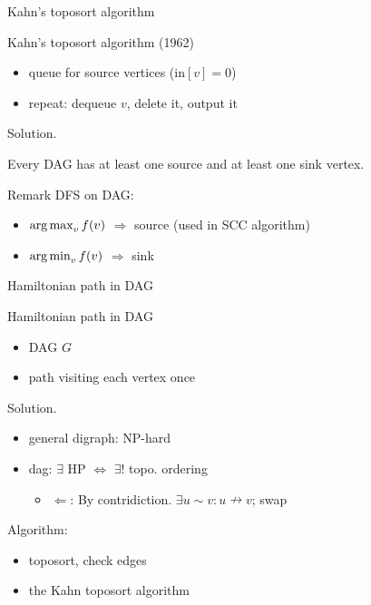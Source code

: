 \begin{frame}{Kahn's toposort algorithm}
  \begin{exampleblock}{Kahn's toposort algorithm (1962) }
    \begin{itemize}
      \item queue for source vertices ($\text{in}[v] = 0$)
      \item repeat: dequeue $v$, delete it, output it
    \end{itemize}
  \end{exampleblock}

  \begin{block}{Solution.}
    \begin{lemma}
      Every DAG has at least one source and at least one sink vertex.
    \end{lemma}
  \end{block}

  \begin{alertblock}{Remark}
    DFS on DAG:
    \begin{itemize}
      \item $\operatorname*{arg\,max}_{v} f(v)$ $\Rightarrow$ source (used in SCC algorithm)
      \item $\operatorname*{arg\,min}_{v} f(v)$ $\Rightarrow$ sink
    \end{itemize}
  \end{alertblock}
\end{frame}
\begin{frame}{Hamiltonian path in DAG}
  \begin{exampleblock}{Hamiltonian path in DAG }
    \begin{itemize}
      \item DAG $G$
      \item path visiting each vertex once
    \end{itemize}
  \end{exampleblock}

  \begin{block}{Solution.}
    \begin{itemize}
      \item general digraph: NP-hard
      \item dag: $\exists$ HP $\iff$ $\exists!$ topo. ordering
	\begin{itemize}
	  \item $\Leftarrow$: By contridiction. $\exists u \sim v: u \nrightarrow v$; swap
	\end{itemize}
    \end{itemize}

    Algorithm:
    \begin{itemize}
      \item toposort, check edges
      \item the Kahn toposort algorithm
    \end{itemize}
  \end{block}
\end{frame}
